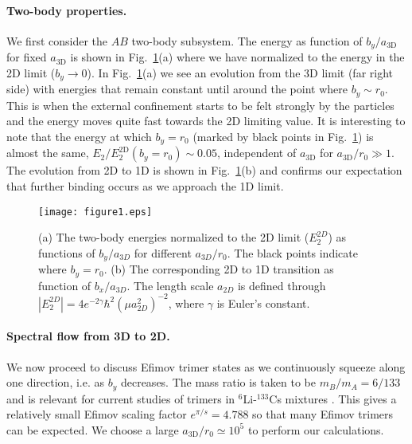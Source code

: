 \documentclass[twocolumn,showpacs,aps,prl,10pt]{revtex4}
\begin{document}
\paragraph*{Two-body properties.}
We first consider the $AB$ two-body subsystem. 
The energy as function of $b_y/a_\textrm{3D}$ for fixed
$a_\textrm{3D}$ is shown in Fig.~\ref{fig1a}(a) where we have normalized
to the energy in the 2D limit ($b_y\to 0$).  In
Fig.~\ref{fig1a}(a) we see an evolution from the 3D limit (far right
side) with energies that remain constant until around the point where
$b_y\sim r_0$. This is when the external confinement starts to be felt
strongly by the particles and the energy moves quite fast towards the
2D limiting value. It is interesting to note that the energy at which
$b_y=r_0$ (marked by black points in Fig.~\ref{fig1a}) is almost the
same, $E_2/E_2^\textrm{2D}(b_y=r_0)\sim 0.05$, independent
of $a_\textrm{3D}$ for $a_\textrm{3D}/r_0\gg 1$. 
The evolution from
2D to 1D is shown in Fig.~\ref{fig1a}(b) and confirms our expectation 
that further binding occurs as we approach the 1D limit.


\begin{figure}[ht!]
\texttt{[image: figure1.eps]}
\caption{
(a) The two-body energies normalized to the 2D limit ($E_{2}^{2D}$) as functions
of $b_{y}/a_{3D}$ for different $a_{3D}/r_0$. The black points indicate 
where $b_{y} = r_0$. (b) The corresponding 2D to 1D transition as 
function of $b_x/a_{3D}$. The length scale $a_{2D}$ is defined through
$|E_{2}^{2D}|=4e^{-2\gamma}\hbar^2(\mu a_{2D}^{2})^{-2}$, where $\gamma$ is
Euler's constant.
}
\label{fig1a}
\end{figure}





\paragraph*{Spectral flow from 3D to 2D.}
We now proceed to discuss Efimov trimer states as we continuously
squeeze along one direction, i.e. as $b_y$ decreases. The mass ratio
is taken to be $m_B/m_A=6/133$ \cite{note-on-dim} and is relevant for current studies of
trimers in $^6$Li-$^{133}$Cs mixtures
\cite{pires2014,tung2014,ulmanis2016,johansen2016}. This gives a relatively small Efimov
scaling factor $e^{\pi/s}=4.788$ \cite{jen03,yam13} so that many
Efimov trimers can be expected. We choose a large $a_\textrm{3D}/r_0
\simeq 10^5$ to perform our calculations.
\end{document}
